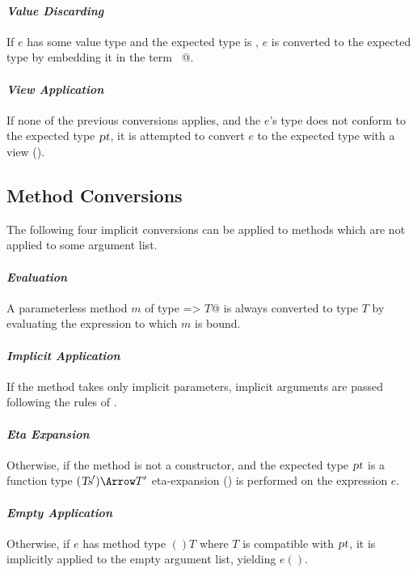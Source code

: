 \paragraph{\em Value Discarding}
If $e$ has some value type and the expected type is ,
$e$ is converted to the expected type by embedding it in the 
term ~@.

\paragraph{\em View Application}
If none of the previous conversions applies, and the $e$'s type
does not conform to the expected type $\mbox{\sl pt}$, it is attempted to convert
$e$ to the expected type with a view ().\bigskip

\subsection{Method Conversions}

The following four implicit conversions can be applied to methods
which are not applied to some argument list.

\paragraph{\em Evaluation}
A parameterless method $m$ of type \lstinline@=> $T$@ is always converted to
type $T$ by evaluating the expression to which $m$ is bound.

\paragraph{\em Implicit Application}
  If the method takes only implicit parameters, implicit
  arguments are passed following the rules of .

\paragraph{\em Eta Expansion}
  Otherwise, if the method is not a constructor, 
  and the expected type $\mbox{\sl pt}$ is a function type
  $(\Ts') \Arrow T'$ eta-expansion
  () is performed on the
  expression $e$.

\paragraph{\em Empty Application}
  Otherwise, if $e$ has method type $()T$ where $T$ is compatible with
  $\mbox{\sl pt}$, it is implicitly applied to the empty
  argument list, yielding $e()$.


